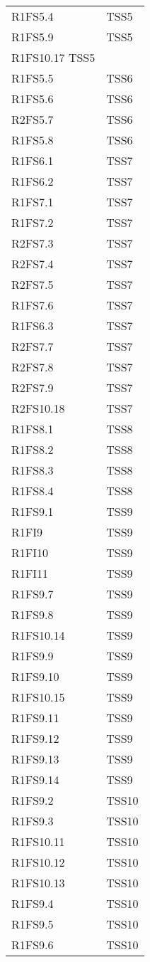 {\begin{longtable}{C{4cm} C{4cm}}
R1FS5.4 & TSS5 \\
R1FS5.9 & TSS5 \\
R1FS10.17 TSS5 \\
R1FS5.5 & TSS6 \\
R1FS5.6 & TSS6 \\
R2FS5.7 & TSS6 \\
R1FS5.8 & TSS6 \\
R1FS6.1 & TSS7 \\
R1FS6.2 & TSS7 \\
R1FS7.1 & TSS7 \\
R1FS7.2 & TSS7 \\
R2FS7.3 & TSS7 \\
R2FS7.4 & TSS7 \\
R2FS7.5 & TSS7 \\
R1FS7.6 & TSS7 \\
R1FS6.3 & TSS7 \\
R2FS7.7 & TSS7 \\
R2FS7.8 & TSS7 \\
R2FS7.9 & TSS7 \\
R2FS10.18 & TSS7 \\
R1FS8.1 & TSS8 \\
R1FS8.2 & TSS8 \\
R1FS8.3 & TSS8 \\
R1FS8.4 & TSS8 \\
R1FS9.1 & TSS9 \\
R1FI9 & TSS9 \\
R1FI10 & TSS9 \\
R1FI11 & TSS9 \\
R1FS9.7 & TSS9 \\
R1FS9.8 & TSS9 \\
R1FS10.14 & TSS9 \\
R1FS9.9 & TSS9 \\
R1FS9.10 & TSS9 \\
R1FS10.15 & TSS9 \\
R1FS9.11 & TSS9 \\
R1FS9.12 & TSS9 \\
R1FS9.13 & TSS9 \\
R1FS9.14 & TSS9 \\
R1FS9.2 & TSS10 \\
R1FS9.3 & TSS10 \\
R1FS10.11 & TSS10 \\
R1FS10.12 & TSS10 \\
R1FS10.13 & TSS10 \\
R1FS9.4 & TSS10 \\
R1FS9.5 & TSS10 \\
R1FS9.6 & TSS10 \\

\end{longtable}
}






















